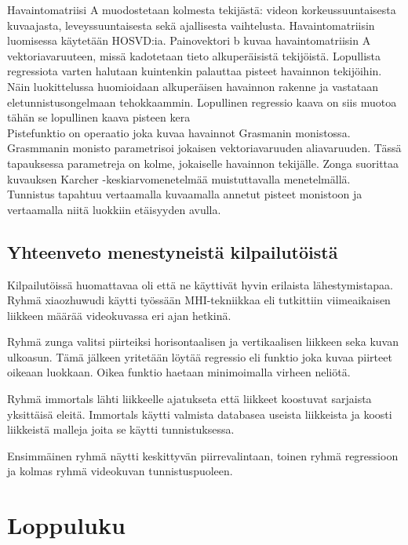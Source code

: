 Havaintomatriisi A muodostetaan kolmesta tekijästä: videon korkeussuuntaisesta kuvaajasta, leveyssuuntaisesta sekä ajallisesta vaihtelusta.
Havaintomatriisin luomisessa käytetään HOSVD:ia. Painovektori b kuvaa havaintomatriisin A vektoriavaruuteen, missä kadotetaan tieto alkuperäisistä tekijöistä. 
Lopullista regressiota varten halutaan kuintenkin palauttaa pisteet havainnon tekijöihin.
Näin luokittelussa huomioidaan alkuperäisen havainnon rakenne ja vastataan eletunnistusongelmaan tehokkaammin. 
Lopullinen regressio kaava on siis muotoa\\
tähän se lopullinen kaava pisteen kera\\
Pistefunktio on operaatio joka kuvaa havainnot Grasmanin monistossa. Grasmmanin monisto parametrisoi jokaisen vektoriavaruuden aliavaruuden.
Tässä tapauksessa parametreja on kolme, jokaiselle havainnon tekijälle.
Zonga suorittaa kuvauksen Karcher -keskiarvomenetelmää muistuttavalla menetelmällä.\\

Tunnistus tapahtuu vertaamalla kuvaamalla annetut pisteet monistoon ja vertaamalla niitä luokkiin etäisyyden avulla.\\


\subsection{Yhteenveto menestyneistä kilpailutöistä}
Kilpailutöissä huomattavaa oli että ne käyttivät hyvin erilaista lähestymistapaa. 
Ryhmä xiaozhuwudi käytti työssään MHI-tekniikkaa eli tutkittiin viimeaikaisen liikkeen määrää videokuvassa eri ajan hetkinä.

Ryhmä zunga valitsi piirteiksi horisontaalisen ja vertikaalisen liikkeen seka kuvan ulkoasun. Tämä jälkeen yritetään löytää
regressio eli funktio joka kuvaa piirteet oikeaan luokkaan. Oikea funktio haetaan minimoimalla virheen neliötä.

Ryhmä immortals lähti liikkeelle ajatukseta että liikkeet koostuvat sarjaista yksittäisä eleitä.
Immortals käytti valmista databasea useista liikkeista ja koosti liikkeistä malleja joita se käytti tunnistuksessa.

Ensimmäinen ryhmä näytti keskittyvän piirrevalintaan, toinen ryhmä regressioon ja kolmas ryhmä videokuvan tunnistuspuoleen.




















\section{Loppuluku}




